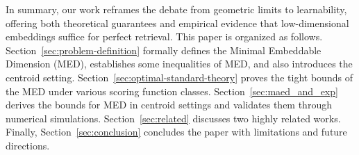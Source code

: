 In summary, our work reframes the debate from geometric limits to learnability, offering both theoretical guarantees and empirical evidence that low-dimensional embeddings suffice for perfect retrieval.
This paper is organized as follows. Section~\ref{sec:problem-definition} formally defines the Minimal Embeddable Dimension (MED), establishes some inequalities of MED, and also introduces the centroid setting. Section~\ref{sec:optimal-standard-theory} proves the tight bounds of the MED under various scoring function classes. Section~\ref{sec:maed_and_exp} derives the bounds for MED in centroid settings and validates them through numerical simulations. Section~\ref{sec:related} discusses two highly related works. Finally, Section~\ref{sec:conclusion} concludes the paper with limitations and future directions.
